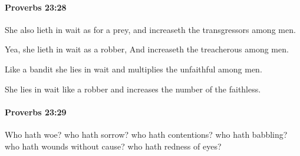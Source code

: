 		\paragraph{Proverbs 23:28} %
			\label{PROVERBS-23-28}

			She also lieth in wait as for a prey, and increaseth the transgressors among men.

			\begin{versebox}
					\item[BHS] 
					\item[ASV] Yea, she lieth in wait as a robber, And increaseth the treacherous among men.
					\item[NIV] Like a bandit she lies in wait and multiplies the unfaithful among men.
					\item[NRSV] She lies in wait like a robber and increases the number of the faithless.
			\end{versebox}

		\paragraph{Proverbs 23:29} %
			\label{PROVERBS-23-29}

			Who hath woe? who hath sorrow? who hath contentions? who hath babbling? who hath wounds without cause? who hath redness of eyes?

